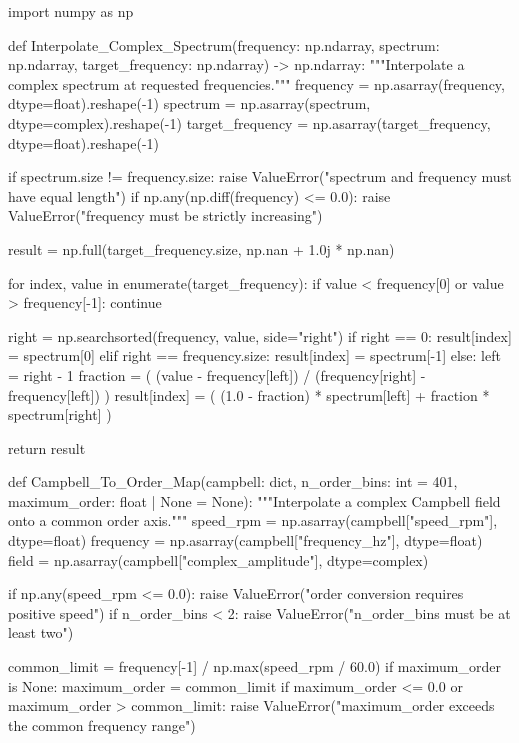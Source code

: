 \begin{python}
import numpy as np


def Interpolate_Complex_Spectrum(frequency: np.ndarray,
                                 spectrum: np.ndarray,
                                 target_frequency: np.ndarray) -> np.ndarray:
    """Interpolate a complex spectrum at requested frequencies."""
    frequency = np.asarray(frequency, dtype=float).reshape(-1)
    spectrum = np.asarray(spectrum, dtype=complex).reshape(-1)
    target_frequency = np.asarray(target_frequency, dtype=float).reshape(-1)

    if spectrum.size != frequency.size:
        raise ValueError("spectrum and frequency must have equal length")
    if np.any(np.diff(frequency) <= 0.0):
        raise ValueError("frequency must be strictly increasing")

    result = np.full(target_frequency.size, np.nan + 1.0j * np.nan)

    for index, value in enumerate(target_frequency):
        if value < frequency[0] or value > frequency[-1]:
            continue

        right = np.searchsorted(frequency, value, side="right")
        if right == 0:
            result[index] = spectrum[0]
        elif right == frequency.size:
            result[index] = spectrum[-1]
        else:
            left = right - 1
            fraction = (
                (value - frequency[left])
                / (frequency[right] - frequency[left])
            )
            result[index] = (
                (1.0 - fraction) * spectrum[left]
                + fraction * spectrum[right]
            )

    return result


def Campbell_To_Order_Map(campbell: dict,
                           n_order_bins: int = 401,
                           maximum_order: float | None = None):
    """Interpolate a complex Campbell field onto a common order axis."""
    speed_rpm = np.asarray(campbell["speed_rpm"], dtype=float)
    frequency = np.asarray(campbell["frequency_hz"], dtype=float)
    field = np.asarray(campbell["complex_amplitude"], dtype=complex)

    if np.any(speed_rpm <= 0.0):
        raise ValueError("order conversion requires positive speed")
    if n_order_bins < 2:
        raise ValueError("n_order_bins must be at least two")

    common_limit = frequency[-1] / np.max(speed_rpm / 60.0)
    if maximum_order is None:
        maximum_order = common_limit
    if maximum_order <= 0.0 or maximum_order > common_limit:
        raise ValueError("maximum_order exceeds the common frequency range")


\end{python}
